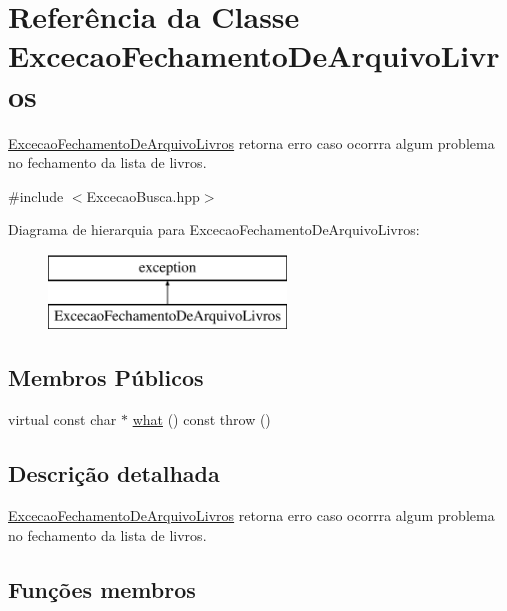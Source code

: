 \hypertarget{class_excecao_fechamento_de_arquivo_livros}{}\section{Referência da Classe Excecao\+Fechamento\+De\+Arquivo\+Livros}
\label{class_excecao_fechamento_de_arquivo_livros}


\mbox{\hyperlink{class_excecao_fechamento_de_arquivo_livros}{Excecao\+Fechamento\+De\+Arquivo\+Livros}} retorna erro caso ocorrra algum problema no fechamento da lista de livros.  




{\ttfamily \#include $<$Excecao\+Busca.\+hpp$>$}

Diagrama de hierarquia para Excecao\+Fechamento\+De\+Arquivo\+Livros\+:\begin{figure}[H]
\begin{center}
\leavevmode
\includegraphics[height=2.000000cm]{class_excecao_fechamento_de_arquivo_livros}
\end{center}
\end{figure}
\subsection*{Membros Públicos}
\begin{DoxyCompactItemize}
\item 
virtual const char $\ast$ \mbox{\hyperlink{class_excecao_fechamento_de_arquivo_livros_aec1ab680e15d915fa3298621a4fe2604}{what}} () const  throw ()
\end{DoxyCompactItemize}


\subsection{Descrição detalhada}
\mbox{\hyperlink{class_excecao_fechamento_de_arquivo_livros}{Excecao\+Fechamento\+De\+Arquivo\+Livros}} retorna erro caso ocorrra algum problema no fechamento da lista de livros. 

\subsection{Funções membros}
\mbox{\label{class_excecao_fechamento_de_arquivo_livros_aec1ab680e15d915fa3298621a4fe2604}} 
